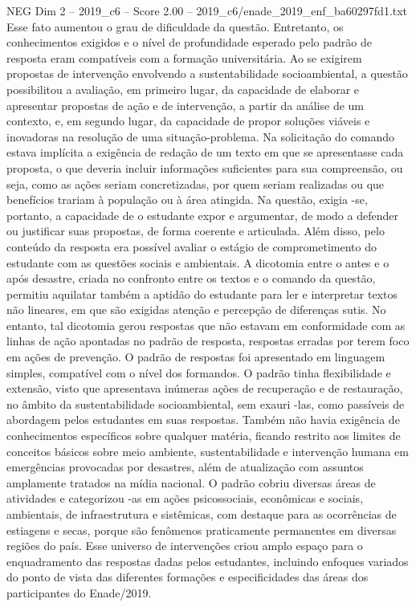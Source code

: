 \begin{textsample}{NEG Dim 2 – 2019\_c6 – Score 2.00 – 2019\_c6/enade\_2019\_enf\_ba60297fd1.txt}
Esse fato aumentou o grau de dificuldade da questão.
Entretanto, os conhecimentos exigidos e o nível de profundidade esperado pelo padrão de resposta eram compatíveis com a formação universitária.
Ao se exigirem propostas de intervenção envolvendo a sustentabilidade socioambiental, a questão possibilitou a avaliação, em primeiro lugar, da capacidade de elaborar e apresentar propostas de ação e de intervenção, a partir da análise de um contexto, e, em segundo lugar, da capacidade de propor soluções viáveis e inovadoras na resolução de uma situação-problema.
Na solicitação do comando estava implícita a exigência de redação de um texto em que se apresentasse cada proposta, o que deveria incluir informações suficientes para sua compreensão, ou seja, como as ações seriam concretizadas, por quem seriam realizadas ou que benefícios trariam à população ou à área atingida.
Na questão, exigia -se, portanto, a capacidade de o estudante expor e argumentar, de modo a defender ou justificar suas propostas, de forma coerente e articulada.
Além disso, pelo conteúdo da resposta era possível avaliar o estágio de comprometimento do estudante com as questões sociais e ambientais.
A dicotomia entre o antes e o após desastre, criada no confronto entre os textos e o comando da questão, permitiu aquilatar também a aptidão do estudante para ler e interpretar textos não lineares, em que são exigidas atenção e percepção de diferenças sutis.
No entanto, tal dicotomia gerou respostas que não estavam em conformidade com as linhas de ação apontadas no padrão de resposta, respostas erradas por terem foco em ações de prevenção.
O padrão de respostas foi apresentado em linguagem simples, compatível com o nível dos formandos.
O padrão tinha flexibilidade e extensão, visto que apresentava inúmeras ações de recuperação e de restauração, no âmbito da sustentabilidade socioambiental, sem exauri -las, como passíveis de abordagem pelos estudantes em suas respostas.
Também não havia exigência de conhecimentos específicos sobre qualquer matéria, ficando restrito aos limites de conceitos básicos sobre meio ambiente, sustentabilidade e intervenção humana em emergências provocadas por desastres, além de atualização com assuntos amplamente tratados na mídia nacional.
O padrão cobriu diversas áreas de atividades e categorizou -as em ações psicossociais, econômicas e sociais, ambientais, de infraestrutura e sistêmicas, com destaque para as ocorrências de estiagens e secas, porque são fenômenos praticamente permanentes em diversas regiões do país.
Esse universo de intervenções criou amplo espaço para o enquadramento das respostas dadas pelos estudantes, incluindo enfoques variados do ponto de vista das diferentes formações e especificidades das áreas dos participantes do Enade/2019.

\end{textsample}
